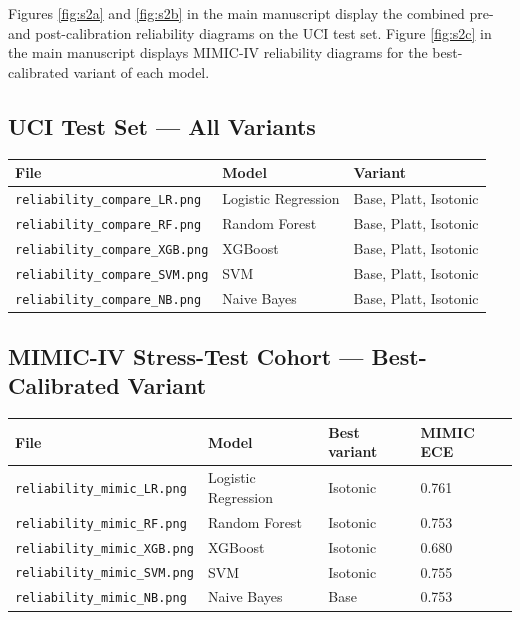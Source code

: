 \documentclass[11pt]{article}
\begin{document}
Figures \ref{fig:s2a} and \ref{fig:s2b} in the main manuscript display the
combined pre- and post-calibration reliability diagrams on the UCI test set.
Figure \ref{fig:s2c} in the main manuscript displays MIMIC-IV reliability
diagrams for the best-calibrated variant of each model.

\subsection*{UCI Test Set — All Variants}

\begin{center}
\begin{tabular}{lll}
\toprule
File & Model & Variant \\
\midrule
\texttt{reliability\_compare\_LR.png}  & Logistic Regression & Base, Platt, Isotonic \\
\texttt{reliability\_compare\_RF.png}  & Random Forest       & Base, Platt, Isotonic \\
\texttt{reliability\_compare\_XGB.png} & XGBoost             & Base, Platt, Isotonic \\
\texttt{reliability\_compare\_SVM.png} & SVM                 & Base, Platt, Isotonic \\
\texttt{reliability\_compare\_NB.png}  & Naive Bayes         & Base, Platt, Isotonic \\
\bottomrule
\end{tabular}
\end{center}

\subsection*{MIMIC-IV Stress-Test Cohort — Best-Calibrated Variant}

\begin{center}
\begin{tabular}{llll}
\toprule
File & Model & Best variant & MIMIC ECE \\
\midrule
\texttt{reliability\_mimic\_LR.png}  & Logistic Regression & Isotonic & 0.761 \\
\texttt{reliability\_mimic\_RF.png}  & Random Forest       & Isotonic & 0.753 \\
\texttt{reliability\_mimic\_XGB.png} & XGBoost             & Isotonic & 0.680 \\
\texttt{reliability\_mimic\_SVM.png} & SVM                 & Isotonic & 0.755 \\
\texttt{reliability\_mimic\_NB.png}  & Naive Bayes         & Base     & 0.753 \\
\bottomrule
\end{tabular}
\end{center}
\end{document}

